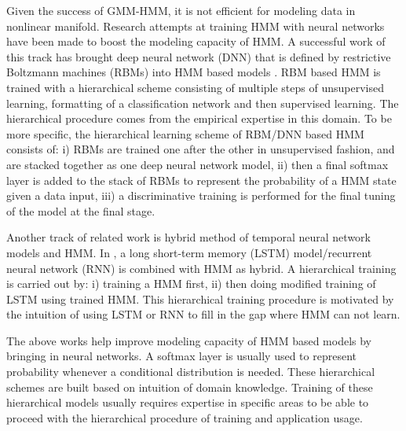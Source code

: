 Given the success of GMM-HMM, it is not efficient for modeling data in nonlinear manifold. Research attempts at training HMM with neural networks have been made to boost the modeling capacity of HMM. A successful work of this track has brought deep neural network (DNN) that is defined by restrictive Boltzmann machines (RBMs) \cite{Hinton2012} into HMM based models \cite{hinton2012deepSpeech,li2013hybrid,Miao2013ImprovingLC}. RBM based HMM is trained with a hierarchical scheme consisting of multiple steps of unsupervised learning, formatting of a classification network and then supervised learning. The hierarchical procedure comes from the empirical expertise in this domain. To be more specific, the hierarchical learning scheme of RBM/DNN based HMM consists of: i) RBMs are trained one after the other in unsupervised fashion, and are stacked together as one deep neural network model, ii) then a final softmax layer is added to the stack of RBMs to represent the probability of a HMM state given a data input, iii) a discriminative training is performed for the final tuning of the model at the final stage.

Another track of related work is hybrid method of temporal neural network models and HMM. In \cite{liu2019lstmHmmHyb,buys2018bridging,vik2016rnnHmm}, a long short-term memory (LSTM) model/recurrent neural network (RNN) is combined with HMM as hybrid. A hierarchical training is carried out by: i) training a HMM first, ii) then doing modified training of LSTM using trained HMM. This hierarchical training procedure is motivated by the intuition of using LSTM or RNN to fill in the gap where HMM can not learn. 


The above works help improve modeling capacity of HMM based models by bringing in neural networks. A softmax layer is usually used to represent probability whenever a conditional distribution is needed. These hierarchical schemes are built based on intuition of domain knowledge. Training of these hierarchical models usually requires expertise in specific areas to be able to proceed with the hierarchical procedure of training and application usage. 

